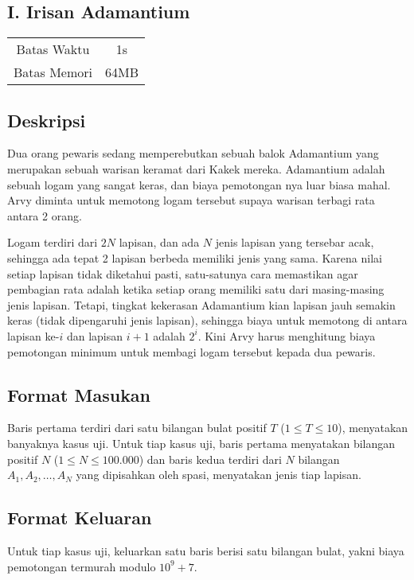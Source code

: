 \documentclass{article}
\begin{document}
\begin{center}
    \section*{I. Irisan Adamantium}

    \begin{tabular}{ | c c | }
        \hline
        Batas Waktu  & 1s \\
        Batas Memori & 64MB \\
        \hline
    \end{tabular}
\end{center}

\subsection*{Deskripsi}
Dua orang pewaris sedang memperebutkan sebuah balok Adamantium yang merupakan sebuah warisan keramat dari Kakek mereka.
Adamantium adalah sebuah logam yang sangat keras, dan biaya pemotongan nya luar biasa mahal.
Arvy diminta untuk memotong logam tersebut supaya warisan terbagi rata antara 2 orang.

Logam terdiri dari $2N$ lapisan, dan ada $N$ jenis lapisan yang tersebar acak, sehingga ada tepat 2 lapisan berbeda memiliki jenis yang sama.
Karena nilai setiap lapisan tidak diketahui pasti, satu-satunya cara memastikan agar pembagian rata adalah ketika setiap orang memiliki satu dari masing-masing jenis lapisan.
Tetapi, tingkat kekerasan Adamantium kian lapisan jauh semakin keras (tidak dipengaruhi jenis lapisan), sehingga biaya untuk memotong di antara lapisan ke-$i$ dan lapisan $i+1$ adalah $2^i$.
Kini Arvy harus menghitung biaya pemotongan minimum untuk membagi logam tersebut kepada dua pewaris.

\subsection*{Format Masukan}
Baris pertama terdiri dari satu bilangan bulat positif $T$ ($1 \leq T \leq 10$), menyatakan banyaknya kasus uji.
Untuk tiap kasus uji, baris pertama menyatakan bilangan positif $N$ ($1 \leq N \leq 100.000$) dan baris kedua terdiri dari $N$ bilangan $A_1, A_2, \dots, A_N$ yang dipisahkan oleh spasi, menyatakan jenis tiap lapisan.

\subsection*{Format Keluaran}
Untuk tiap kasus uji, keluarkan satu baris berisi satu bilangan bulat, yakni biaya pemotongan termurah modulo ${10}^9+7$.
\\
\end{document}
